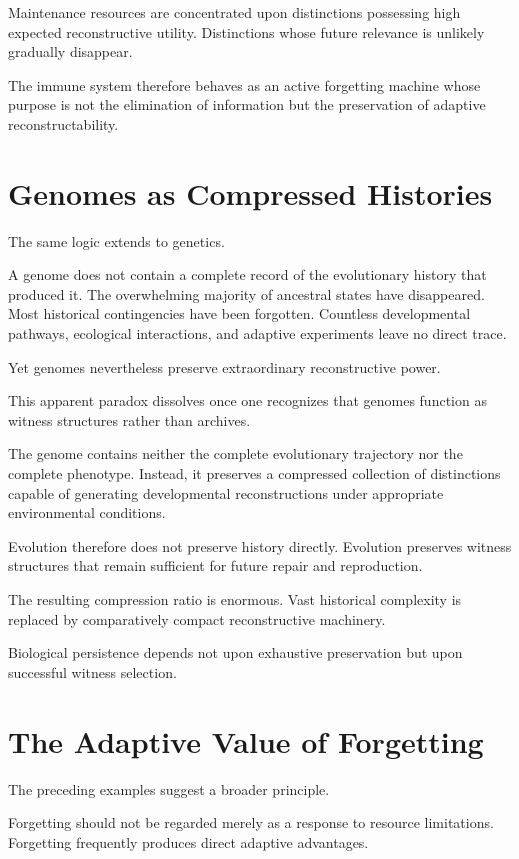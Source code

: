 \documentclass[12pt,oneside]{book}
\theoremstyle{plain} \newtheorem{theorem}{Theorem}[chapter] \newtheorem{lemma}[theorem]{Lemma} \newtheorem{proposition}[theorem]{Proposition} \newtheorem{corollary}[theorem]{Corollary}
\theoremstyle{definition} \newtheorem{definition}[theorem]{Definition} \newtheorem{axiom}[theorem]{Axiom} \newtheorem{construction}[theorem]{Construction}
\theoremstyle{remark} \newtheorem{remark}[theorem]{Remark} \newtheorem{example}[theorem]{Example}
\begin{document}
Maintenance resources are concentrated upon distinctions possessing high expected reconstructive utility. Distinctions whose future relevance is unlikely gradually disappear.

The immune system therefore behaves as an active forgetting machine whose purpose is not the elimination of information but the preservation of adaptive reconstructability.

\section{Genomes as Compressed Histories}

The same logic extends to genetics.

A genome does not contain a complete record of the evolutionary history that produced it. The overwhelming majority of ancestral states have disappeared. Most historical contingencies have been forgotten. Countless developmental pathways, ecological interactions, and adaptive experiments leave no direct trace.

Yet genomes nevertheless preserve extraordinary reconstructive power.

This apparent paradox dissolves once one recognizes that genomes function as witness structures rather than archives.

The genome contains neither the complete evolutionary trajectory nor the complete phenotype. Instead, it preserves a compressed collection of distinctions capable of generating developmental reconstructions under appropriate environmental conditions.

Evolution therefore does not preserve history directly. Evolution preserves witness structures that remain sufficient for future repair and reproduction.

The resulting compression ratio is enormous. Vast historical complexity is replaced by comparatively compact reconstructive machinery.

Biological persistence depends not upon exhaustive preservation but upon successful witness selection.

\section{The Adaptive Value of Forgetting}

The preceding examples suggest a broader principle.

Forgetting should not be regarded merely as a response to resource limitations. Forgetting frequently produces direct adaptive advantages.
\end{document}
